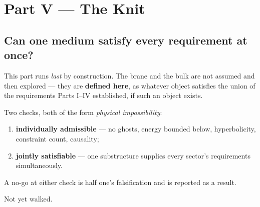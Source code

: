 \part{Part V --- The Knit}

\chapter{Can one medium satisfy every requirement at once?}

This part runs \emph{last} by construction. The brane and the bulk are not
assumed and then explored --- they are \textbf{defined here}, as whatever object
satisfies the union of the requirements Parts I--IV established, if such an
object exists.

Two checks, both of the form \emph{physical impossibility}:
\begin{enumerate}
  \item \textbf{individually admissible} --- no ghosts, energy bounded below,
        hyperbolicity, constraint count, causality;
  \item \textbf{jointly satisfiable} --- one substructure supplies every
        sector's requirements simultaneously.
\end{enumerate}

A no-go at either check is half one's falsification and is reported as a result.

Not yet walked.
